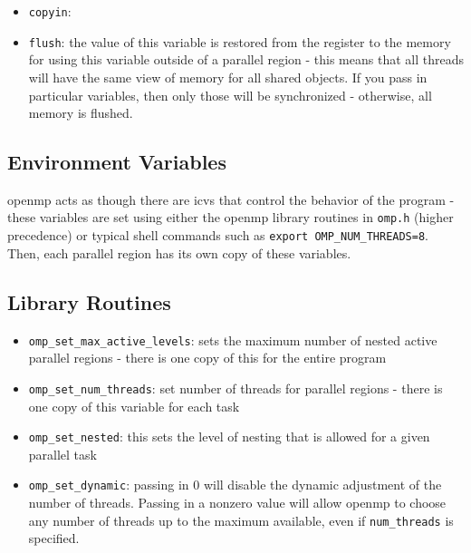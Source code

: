 \documentclass[10pt]{article}
\newcounter{subsubsubsection}[subsubsection]
\begin{document}
\begin{flushleft}

\begin{itemize}
\item {\tt copyin}: 
\end{itemize}


\begin{itemize}
\item {\tt flush}: the value of this variable is restored from the register to the memory for using this variable outside of a parallel region - this means that all threads will have the same view of memory for all shared objects. If you pass in particular variables, then only those will be synchronized - otherwise, all memory is flushed.
\end{itemize}

\subsection{Environment Variables}

\gls{openmp} acts as though there are \gls{icv}s that control the behavior of the program - these variables are set using either the \gls{openmp} library routines in {\tt omp.h} (higher precedence) or typical shell commands such as {\tt export OMP\_NUM\_THREADS=8}. Then, each parallel region has its own copy of these variables.

\subsection{Library Routines}

\begin{itemize}
\item {\tt omp\_set\_max\_active\_levels}: sets the maximum number of nested active parallel regions - there is one copy of this for the entire program
\item {\tt omp\_set\_num\_threads}: set number of threads for parallel regions - there is one copy of this variable for each task
\item {\tt omp\_set\_nested}: this sets the level of nesting that is allowed for a given parallel task
\item {\tt omp\_set\_dynamic}: passing in 0 will disable the dynamic adjustment of the number of threads. Passing in a nonzero value will allow \gls{openmp} to choose any number of threads up to the maximum available, even if {\tt num\_threads} is specified.
\end{itemize}


\end{flushleft}
\end{document}
